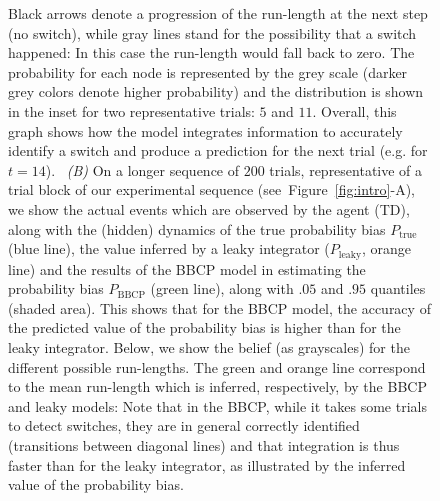 \documentclass[10pt,letterpaper]{article}
\newcommand{\seeFig}[1]{Figure~\ref{fig:#1}}
\newcommand{\CP}[1]{\textbf{\textcolor{green}{[CP: #1]}}}
\begin{document}
\begin{figure}
{Black arrows denote a progression of the run-length at the next step (no switch),
while gray lines stand for the possibility that a switch happened:
In this case the run-length would fall back to zero.
The probability for each node is represented by the grey scale (darker grey colors denote higher probability)
and the distribution is shown in the inset for two representative trials: $5$ and $11$.
Overall, this graph shows how the model integrates information to accurately identify a switch
and produce a prediction for the next trial (e.g. for $t=14$).
~\textit{(B)} On a longer sequence of $200$ trials,
representative of a trial block of our experimental sequence (see~\seeFig{intro}-A), %
we show %
the actual events which are observed by the agent (TD),
along with the (hidden) dynamics of the true probability bias $P_{\text{true}}$ (blue line),
the value inferred by a leaky integrator ($P_{\text{leaky}}$, orange line)
and the results of the BBCP model
in estimating the probability bias $P_{\text{BBCP}}$ (green line),
along with $.05$ and $.95$ quantiles (shaded area).
This shows that for the BBCP model,
the accuracy of the predicted value of the probability bias
is higher than for the leaky integrator.
Below, we show the belief (as grayscales) for the different possible run-lengths.
The green and orange line correspond to the mean run-length which is inferred,
respectively, by the BBCP and leaky models:
Note that in the BBCP, while it takes some trials to detect switches,
they are in general correctly identified (transitions between diagonal lines) and
that integration is thus faster than for the leaky integrator,
as illustrated by the inferred value of the probability bias.
}
\label{fig:Bayesianchangepoint}
\end{figure}
\end{document}
